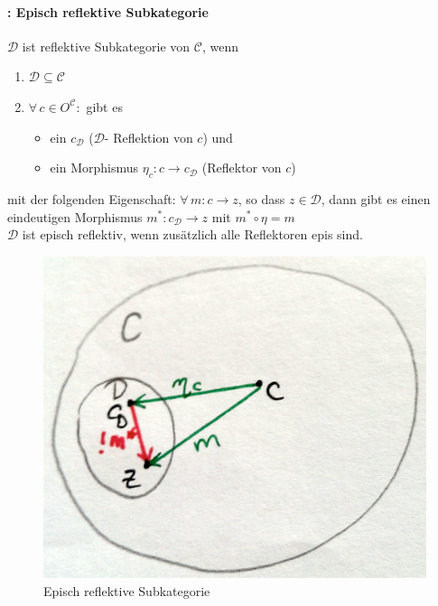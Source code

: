 \paragraph{: Episch reflektive Subkategorie}
$\mathcal{D}$ ist reflektive Subkategorie von $\mathcal{C}$, wenn
\begin{enumerate}
\item $\mathcal{D} \subseteq \mathcal{C}$
\item $\forall \, c \in O^\mathcal{C}: $  gibt es 
\begin{itemize}
\item ein $c_\mathcal{D} $ ($\mathcal{D}$- Reflektion von $c$) und 
\item ein Morphismus $\eta_c: c \rightarrow c_\mathcal{D} $ (Reflektor von $c$) 
\end{itemize}
\end{enumerate}

mit der folgenden Eigenschaft: $\forall \,  m: c \rightarrow z$, so dass $z \in \mathcal{D}$, dann gibt es einen eindeutigen Morphismus $m^* : c_\mathcal{D} \rightarrow z$ mit $m^* \circ \eta = m$ \\
$\mathcal{D} $ ist episch reflektiv, wenn zusätzlich alle Reflektoren epis sind. 

\begin{figure}[h]
\noindent \centering{}\includegraphics[scale=0.1]{Abbildungen/153}\caption{Episch reflektive Subkategorie}
\end{figure}

